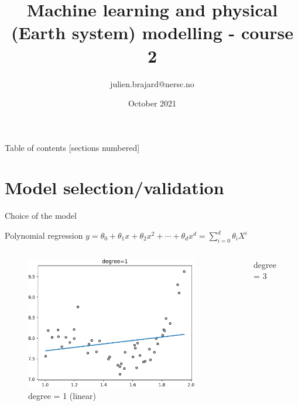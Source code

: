 \documentclass[handout, 10pt]{beamer}
\title[Machine Learning]{Machine learning and physical (Earth system) modelling - course 2}
\author[J. Brajard]{julien.brajard@nersc.no}
\institute[NERSC]{NERSC\\
slides+notebook:\url{https://github.com/nansencenter/nersc_ml_course}}
\date{October 2021}
\begin{document}
\begin{frame}
\titlepage
\end{frame}

\begin{frame}[allowframebreaks]{Table of contents}
  [sections numbered]
  \tableofcontents[hideallsubsections]
\end{frame}


\section{Model selection/validation}

\begin{frame}{Choice of the model}
\begin{block}{Polynomial regression}
$y=\theta_0 + \theta_1 x + \theta_2 x^2 + \cdots + \theta_d x^d = \sum_{i=0}^d \theta_i X^i$
\end{block}
\begin{columns}
\pause
    \begin{figure}
    \caption*{degree = 1 (linear)}
    \includegraphics[width=\textwidth]{interp-pol-1.png}
    \end{figure}
\pause
    \begin{figure}
    \caption*{degree = 3 }

\end{figure}
\end{columns}
\end{frame}
\end{document}
